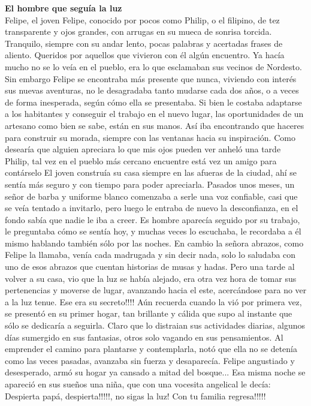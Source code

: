 \documentclass[12pt, a4paper, twoside]{book} %
\begin{document}
\noindent\textbf{El hombre que seguía la luz}\\
Felipe, el joven Felipe, conocido por pocos como Philip, o el filipino, de tez transparente y ojos grandes, con arrugas en su mueca de sonrisa torcida.
Tranquilo, siempre con su andar lento, pocas palabras y acertadas frases de aliento.
Queridos por aquellos que vivieron con él algún encuentro.
Ya hacía mucho no se lo veía en el pueblo, era lo que esclamaban sus vecinos de Nordesto.
Sin embargo Felipe se encontraba más presente que nunca, viviendo con interés sus nuevas aventuras, no le desagradaba tanto mudarse cada dos años, o a veces de forma inesperada, según cómo ella se presentaba.
Si bien le costaba adaptarse a los habitantes y conseguir el trabajo en el nuevo lugar, las oportunidades de un artesano como bien se sabe, están en sus manos.
Así iba encontrando que haceres para construir su morada, siempre con las ventanas hacia su inspiración.
Como desearía que alguien apreciara lo que mis ojos pueden ver anheló una tarde Philip, tal vez en el pueblo más cercano encuentre está vez un amigo para contárselo
El joven construía su casa siempre en las afueras de la ciudad, ahí se sentía más seguro y con tiempo para poder apreciarla.
Pasados unos meses, un señor de barba y uniforme blanco comenzaba a serle una voz confiable, casi que se veía tentado a invitarlo, pero luego le entraba de nuevo la desconfianza, en el fondo sabía que nadie le iba a creer.
Es hombre aparecía seguido por su trabajo, le preguntaba cómo se sentía hoy, y muchas veces lo escuchaba, le recordaba a él mismo hablando también sólo por las noches.
En cambio la señora abrazos, como Felipe la llamaba, venía cada madrugada y sin decir nada, solo lo saludaba con uno de esos abrazos que cuentan historias de musas y hadas.
Pero una tarde al volver a su casa, vio que la luz  se había alejado, era otra vez hora de tomar sus pertenencias y moverse de lugar, avanzando hacia el este, acercándose para no ver a la luz tenue.
Ese era su secreto!!!! Aún recuerda cuando la vió por primera vez, se presentó en su primer hogar, tan brillante y cálida que supo al instante que sólo se dedicaría a seguirla.
Claro que lo distraian sus actividades diarias, algunos días sumergido en sus fantasias, otros solo vagando en sus pensamientos.
Al emprender el camino para plantarse y contemplarla, notó que ella no se detenía como las veces pasadas, avanzaba sin fuerza y desaparecía.
Felipe angustiado y desesperado, armó su hogar ya cansado a mitad del bosque...
Esa misma  noche se apareció en sus sueños una niña, que con una vocesita angelical le decía:
Despierta papá, despierta!!!!!, no sigas la luz!
Con tu familia regresa!!!!!
\end{document}

